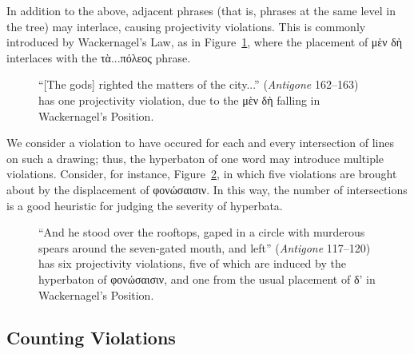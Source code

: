 \documentclass{article}
\begin{document}
In addition to the above, adjacent phrases (that is, phrases at the same level
in the tree) may interlace, causing projectivity violations. This is commonly
introduced by Wackernagel's Law, as in Figure~\ref{fig:wackernagel}, where the
placement of μὲν δὴ interlaces with the τὰ...πόλεος phrase.

\begin{figure}[h!]
\centering
{}
\caption{``[The gods] righted the matters of the city...'' (\emph{Antigone}
162--163) has
one projectivity violation, due to the μὲν δὴ falling in Wackernagel's Position.}
\label{fig:wackernagel}
\end{figure}

We consider a violation to have occured for each and every intersection of lines
on such a drawing; thus, the hyperbaton of one word may introduce multiple
violations. Consider, for instance, Figure~\ref{fig:stas-tree}, in which five
violations are brought about by the displacement of φονώσαισιν. In this way, the
number of intersections is a good heuristic for judging the severity of
hyperbata.

\begin{figure}[h!]
\centering
{}
\caption{``And he stood over the rooftops, gaped in a circle with murderous
spears around the seven-gated mouth, and left'' (\emph{Antigone}
117--120) has six projectivity violations, five of which are induced by the
hyperbaton of φονώσαισιν, and one from the usual placement of δ' in
Wackernagel's Position.}
\label{fig:stas-tree}
\end{figure}

\subsection{Counting Violations}
\end{document}
